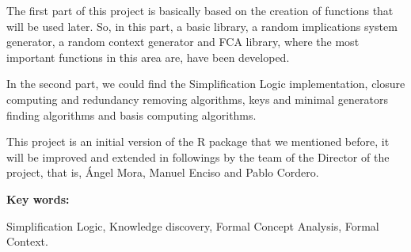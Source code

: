 {The first part of this project is basically 
based on the creation of functions that will be used later. So, in this part, a basic library, a random 
implications system generator, a random context generator and FCA library, where the most important 
functions in this area are, have been developed. 

In the second part, we could find the Simplification 
Logic implementation, closure computing and redundancy removing algorithms, keys and minimal generators 
finding algorithms and basis computing algorithms. 

This project is an initial version of the R package 
that we mentioned before, it will be improved and extended in followings by the team of the Director of 
the project, that is, \'Angel Mora, Manuel Enciso and Pablo Cordero.

\bigskip

\textbf{Key words:} 

Simplification Logic,  Knowledge discovery, 
Formal Concept Analysis, Formal Context.

}
\newpage
\thispagestyle{empty}
\mbox{}
\newpage